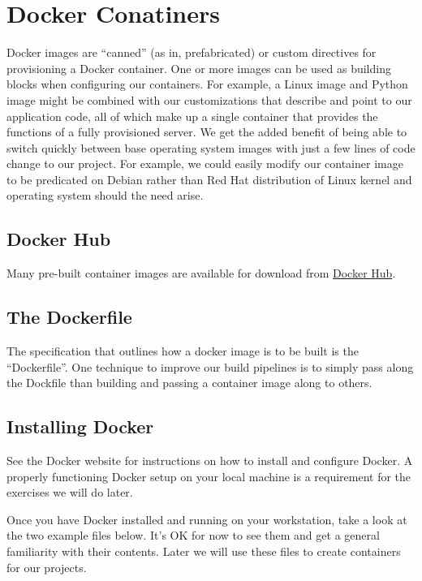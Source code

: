 \section{Docker Conatiners}

\justify{}
Docker images are ``canned'' (as in, prefabricated) or custom directives
for provisioning a Docker container. One or more
images can be used as building blocks when configuring our containers.
For example, a Linux image and Python image might be combined
with our customizations that describe and point to our application code,
all of which make up a single container that provides the functions of
a fully provisioned server. We get the added
benefit of being able to switch quickly between base operating system
images with just a few lines of code change to our project. For example,
we could easily modify our container image to be predicated on Debian
rather than Red Hat distribution of Linux kernel and operating system
should the need arise.

\subsection{Docker Hub}
\justify{}
Many pre-built container images are available for download from 
\href{https://hub.docker.com/}{Docker Hub}. 

\subsection{The Dockerfile}

\justify{}
The specification that outlines how a docker image is to be built is the ``Dockerfile''.
One technique to improve our build pipelines is to simply pass along the Dockfile than
building and passing a container image along to others.

\subsection{Installing Docker}

\justify{}
See the Docker website for instructions on how to install and configure
Docker. A properly functioning Docker setup on your local machine is a requirement
for the exercises we will do later. 




\justify{}
Once you have Docker installed and running on your workstation, take a
look at the two example files below. It's OK for now to see them and get
a general familiarity with their contents. Later we will use these files
to create containers for our projects.

